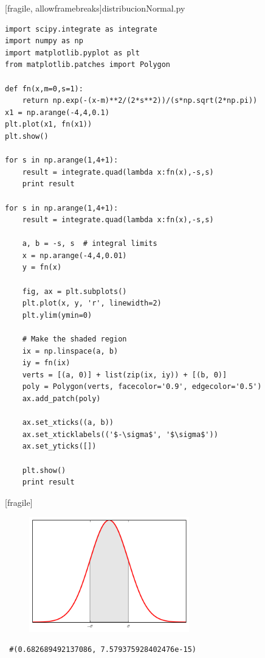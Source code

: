 [fragile, allowframebreaks]{distribucionNormal.py}
 \begin{verbatim}
import scipy.integrate as integrate
import numpy as np
import matplotlib.pyplot as plt
from matplotlib.patches import Polygon

def fn(x,m=0,s=1):
    return np.exp(-(x-m)**2/(2*s**2))/(s*np.sqrt(2*np.pi))
x1 = np.arange(-4,4,0.1)
plt.plot(x1, fn(x1))
plt.show()

for s in np.arange(1,4+1):
    result = integrate.quad(lambda x:fn(x),-s,s)
    print result

for s in np.arange(1,4+1):
    result = integrate.quad(lambda x:fn(x),-s,s)

    a, b = -s, s  # integral limits
    x = np.arange(-4,4,0.01)
    y = fn(x)

    fig, ax = plt.subplots()
    plt.plot(x, y, 'r', linewidth=2)
    plt.ylim(ymin=0)

    # Make the shaded region
    ix = np.linspace(a, b)
    iy = fn(ix)
    verts = [(a, 0)] + list(zip(ix, iy)) + [(b, 0)]
    poly = Polygon(verts, facecolor='0.9', edgecolor='0.5')
    ax.add_patch(poly)

    ax.set_xticks((a, b))
    ax.set_xticklabels(('$-\sigma$', '$\sigma$'))
    ax.set_yticks([])

    plt.show()
    print result
 \end{verbatim}


[fragile]
 \begin{figure}[h]
 \centering
 \includegraphics[height=5cm,keepaspectratio=true]{./pe/norm1.png}
 \label{fig:norm1}
\end{figure}
\begin{verbatim}
 #(0.682689492137086, 7.579375928402476e-15)
\end{verbatim}


